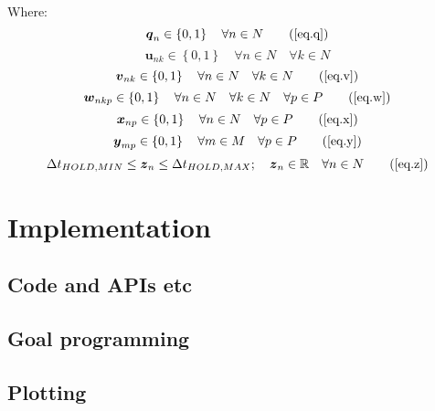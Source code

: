 Where:
\begin{equation}
    \boldsymbol{q}_{n} \in \left\{ 0, 1 \right\} \quad \forall n \in N
    \tag{\ref{eq.q}}
\end{equation}
\begin{equation}
    \boldsymbol{u}_{nk} \in \left\{ 0, 1 \right\} \quad \forall n \in N \quad
    \forall k \in N
    \label{eq.u}
\end{equation}
\begin{equation}
    \boldsymbol{v}_{nk} \in \left\{ 0, 1 \right\} \quad \forall n \in N \quad
    \forall k \in N
    \tag{\ref{eq.v}}
\end{equation}
\begin{equation}
    \boldsymbol{w}_{nkp} \in \left\{ 0, 1 \right\} \quad \forall n \in N \quad
    \forall k \in N \quad \forall p \in P
    \tag{\ref{eq.w}}
\end{equation}
\begin{equation}
    \boldsymbol{x}_{np} \in \left\{ 0, 1 \right\} \quad \forall n \in N \quad
    \forall p \in P
    \tag{\ref{eq.x}}
\end{equation}
\begin{equation}
    \boldsymbol{y}_{mp} \in \left\{ 0, 1 \right\} \quad \forall m \in M \quad
    \forall p \in P
    \tag{\ref{eq.y}}
\end{equation}
\begin{equation}
    \Delta t_{HOLD,MIN} \le \boldsymbol{z}_{n} \le \Delta t_{HOLD,MAX}; \quad
    \boldsymbol{z}_{n} \in \mathbb{R} \quad \forall n \in N
    \tag{\ref{eq.z}}
\end{equation}

\section{Implementation}\label{S.implementation}

\subsection{Code and APIs etc}\label{SS.completesummary}

\subsection{Goal programming}\label{SS.completesummary}

\subsection{Plotting}\label{SS.completesummary}
